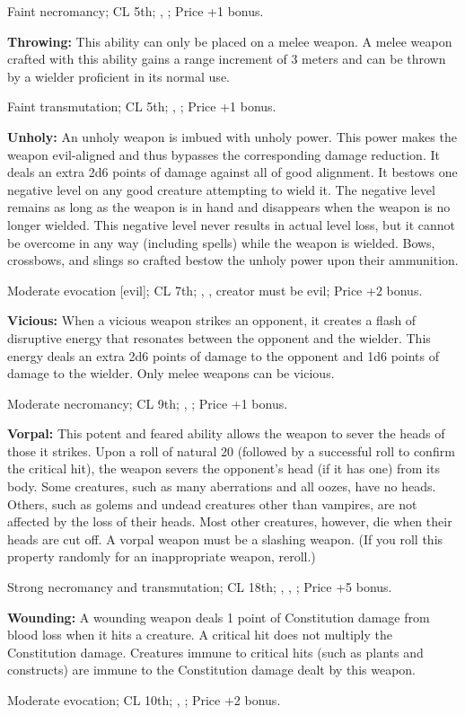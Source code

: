 Faint necromancy; CL 5th; , ; Price +1 bonus.

\textbf{Throwing:} This ability can only be placed on a melee weapon. A melee weapon crafted with this ability gains a range increment of 3 meters and can be thrown by a wielder proficient in its normal use.

Faint transmutation; CL 5th; , ; Price +1 bonus.

\textbf{Unholy:} An unholy weapon is imbued with unholy power. This power makes the weapon evil-aligned and thus bypasses the corresponding damage reduction. It deals an extra 2d6 points of damage against all of good alignment. It bestows one negative level on any good creature attempting to wield it. The negative level remains as long as the weapon is in hand and disappears when the weapon is no longer wielded. This negative level never results in actual level loss, but it cannot be overcome in any way (including  spells) while the weapon is wielded. Bows, crossbows, and slings so crafted bestow the unholy power upon their ammunition.

Moderate evocation [evil]; CL 7th; , , creator must be evil; Price +2 bonus.

\textbf{Vicious:} When a vicious weapon strikes an opponent, it creates a flash of disruptive energy that resonates between the opponent and the wielder. This energy deals an extra 2d6 points of damage to the opponent and 1d6 points of damage to the wielder. Only melee weapons can be vicious.

Moderate necromancy; CL 9th; , ; Price +1 bonus.

\textbf{Vorpal:} This potent and feared ability allows the weapon to sever the heads of those it strikes. Upon a roll of natural 20 (followed by a successful roll to confirm the critical hit), the weapon severs the opponent's head (if it has one) from its body. Some creatures, such as many aberrations and all oozes, have no heads. Others, such as golems and undead creatures other than vampires, are not affected by the loss of their heads. Most other creatures, however, die when their heads are cut off. A vorpal weapon must be a slashing weapon. (If you roll this property randomly for an inappropriate weapon, reroll.)

Strong necromancy and transmutation; CL 18th; , , ; Price +5 bonus.

\textbf{Wounding:} A wounding weapon deals 1 point of Constitution damage from blood loss when it hits a creature. A critical hit does not multiply the Constitution damage. Creatures immune to critical hits (such as plants and constructs) are immune to the Constitution damage dealt by this weapon.

Moderate evocation; CL 10th; , ; Price +2 bonus.
